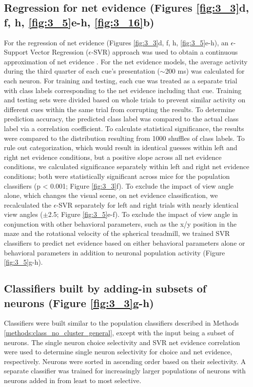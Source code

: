\subsection[Multi-class classifications]{Regression for net evidence (Figures \ref{fig:3_3}d, f, h, \ref{fig:3_5}e-h, \ref{fig:3_16}b)} \label{methods:multi_class_classifications}
For the regression of net evidence (Figures \ref{fig:3_3}d, f, h, \ref{fig:3_5}e-h), an $\epsilon$-Support Vector Regression ($\epsilon$-SVR) approach was used to obtain a continuous approximation of net evidence \citep{Murphy:2012uq, Smola:1997uw, Chang:2006bj}. For the net evidence models, the average activity during the third quarter of each cue’s presentation ($\sim$200 ms) was calculated for each neuron. For training and testing, each cue was treated as a separate trial with class labels corresponding to the net evidence including that cue. Training and testing sets were divided based on whole trials to prevent similar activity on different cues within the same trial from corrupting the results. To determine prediction accuracy, the predicted class label was compared to the actual class label via a correlation coefficient. To calculate statistical significance, the results were compared to the distribution resulting from 1000 shuffles of class labels. To rule out categorization, which would result in identical guesses within left and right net evidence conditions, but a positive slope across all net evidence conditions, we calculated significance separately within left and right net evidence conditions; both were statistically significant across mice for the population classifiers (p < 0.001; Figure \ref{fig:3_3}f). To exclude the impact of view angle alone, which changes the visual scene, on net evidence classification, we recalculated the $\epsilon$-SVR separately for left and right trials with nearly identical view angles ($\pm$2.5\textdegree; Figure \ref{fig:3_5}e-f). To exclude the impact of view angle in conjunction with other behavioral parameters, such as the x/y position in the maze and the rotational velocity of the spherical treadmill, we trained SVR classifiers to predict net evidence based on either behavioral parameters alone or behavioral parameters in addition to neuronal population activity (Figure \ref{fig:3_5}g-h).

\subsection[Classifiers built by adding-in subsets of neurons]{Classifiers built by adding-in subsets of neurons (Figure \ref{fig:3_3}g-h)} \label{methods:addin}
Classifiers were built similar to the population classifiers described in Methods \ref{methods:class_no_cluster_general}, except with the input being a subset of neurons. The single neuron choice selectivity and SVR net evidence correlation were used to determine single neuron selectivity for choice and net evidence, respectively. Neurons were sorted in ascending order based on their selectivity. A separate classifier was trained for increasingly larger populations of neurons with neurons added in from least to most selective. 


